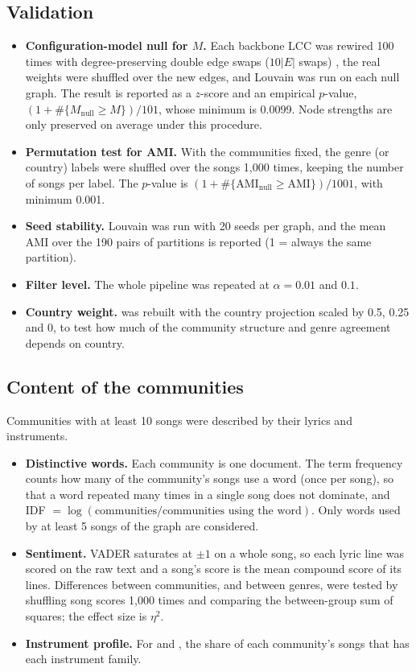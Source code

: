 \subsection*{Validation}
\begin{itemize}
  \item \textbf{Configuration-model null for $M$.} Each backbone LCC was rewired 100 times with degree-preserving double edge swaps ($10|E|$ swaps) \cite{TODO_maslov2002rewiring}, the real weights were shuffled over the new edges, and Louvain was run on each null graph. The result is reported as a $z$-score and an empirical $p$-value, $(1 + \#\{M_{\mathrm{null}} \geq M\})/101$, whose minimum is 0.0099. Node strengths are only preserved on average under this procedure.
  \item \textbf{Permutation test for AMI.} With the communities fixed, the genre (or country) labels were shuffled over the songs 1,000 times, keeping the number of songs per label. The $p$-value is $(1+\#\{\mathrm{AMI}_{ \mathrm{null}} \geq \mathrm{AMI}\})/1001$, with minimum 0.001.
  \item \textbf{Seed stability.} Louvain was run with 20 seeds per graph, and the mean AMI over the 190 pairs of partitions is reported (1 = always the same partition).
  \item \textbf{Filter level.} The whole pipeline was repeated at $\alpha = 0.01$ and $0.1$.
  \item \textbf{Country weight.} \Gcomb{} was rebuilt with the country projection scaled by 0.5, 0.25 and 0, to test how much of the community structure and genre agreement depends on country.
\end{itemize}

\subsection*{Content of the communities}
Communities with at least 10 songs were described by their lyrics and instruments.
\begin{itemize}
  \item \textbf{Distinctive words.} Each community is one document. The term frequency counts how many of the community's songs use a word (once per song), so that a word repeated many times in a single song does not dominate, and IDF $= \log(\text{communities} / \text{communities using the word})$. Only words used by at least 5 songs of the graph are considered.
  \item \textbf{Sentiment.} VADER \cite{TODO_hutto2014vader} saturates at $\pm 1$ on a whole song, so each lyric line was scored on the raw text and a song's score is the mean compound score of its lines. Differences between communities, and between genres, were tested by shuffling song scores 1,000 times and comparing the between-group sum of squares; the effect size is $\eta^2$.
  \item \textbf{Instrument profile.} For \Ginst{} and \Gcomb, the share of each community's songs that has each instrument family.
\end{itemize}

